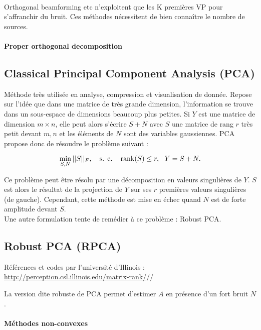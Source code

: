 \paragraph{\tbullet } Orthogonal beamforming etc n'exploitent que les K premières VP pour s'affranchir du bruit. Ces méthodes nécessitent de bien connaître le nombre de sources.


\paragraph{\tbullet  Proper orthogonal decomposition}

\subsection{Classical Principal Component Analysis (PCA)}
Méthode très utilisée en analyse, compression et visualisation de donnée. Repose sur l'idée que dans une matrice de très grande dimension, l'information  se trouve dans un sous-espace de dimensions beaucoup plus petites. Si $Y$ est une matrice de dimension $m \times n$, elle peut alors s'écrire $S + N$ avec $S$ une matrice de rang $r$ très petit devant $m,n$ et les éléments de $N$ sont des variables gaussiennes. PCA propose donc de résoudre le problème suivant : 

\begin{equation}
    \min_{S,N} || S ||_F, ~~~\text{s. c.~~~} \operatorname{rank}(S) \le r ,~~Y=S+N.
\end{equation}

Ce problème peut être résolu par une décomposition en valeurs singulières de $Y$. $S$ est alors le résultat de la projection de $Y$ sur ses $r$ premières valeurs singulières (de gauche).
Cependant, cette méthode est mise en échec quand $N$ est de forte amplitude devant $S$. \\
Une autre formulation tente de remédier à ce problème : Robust PCA.

\subsection{Robust PCA (RPCA)}
Références et codes par l'université d'Illinois : \url{http://perception.csl.illinois.edu/matrix-rank/}//

La version dite robuste de PCA permet d'estimer $A$ en présence d'un fort bruit $N$.

\paragraph{\tbullet Méthodes non-convexes}


